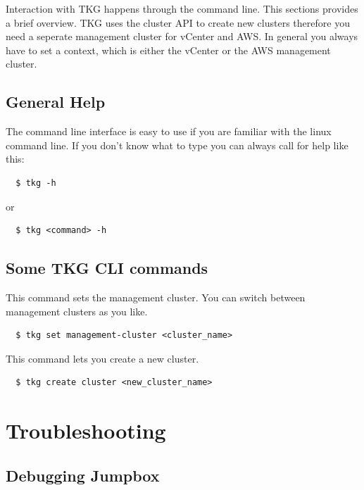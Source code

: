 \documentclass{article}
\begin{document}
Interaction with TKG happens through the command line. This sections provides a brief overview.
TKG uses the cluster API \citep{clusterapi} to create new clusters therefore you need a seperate management cluster for vCenter and AWS. In general you always have to set a context, which is either the vCenter or the AWS management cluster. \\

\subsection{General Help}

The command line interface is easy to use if you are familiar with the linux command line. If you don't know what to type you can always call for help like this:

\begin{lstlisting}
  $ tkg -h
\end{lstlisting}

or 

\begin{lstlisting}
  $ tkg <command> -h
\end{lstlisting}




\subsection{Some TKG CLI commands}

\noindent This command sets the management cluster. You can switch between management clusters as you like.
\begin{lstlisting}
  $ tkg set management-cluster <cluster_name> 
\end{lstlisting}


\noindent This command lets you create a new cluster.
\begin{lstlisting}
  $ tkg create cluster <new_cluster_name>
\end{lstlisting}





\section{Troubleshooting}

\subsection{Debugging Jumpbox}
\end{document}
